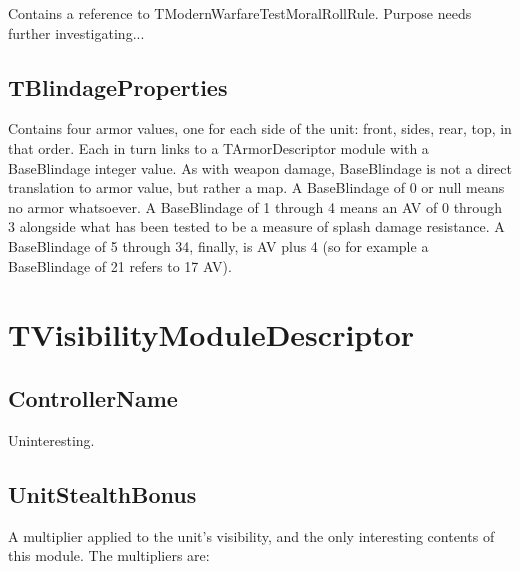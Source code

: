 \documentclass{article}
\begin{document}
Contains a reference to TModernWarfareTestMoralRollRule. Purpose needs further investigating...

\subsection{TBlindageProperties}

Contains four armor values, one for each side of the unit: front, sides, rear, top, in that order. Each in turn links to a TArmorDescriptor module with a BaseBlindage integer value. As with weapon damage, BaseBlindage is not a direct translation to armor value, but rather a map. A BaseBlindage of 0 or null means no armor whatsoever. A BaseBlindage of 1 through 4 means an AV of 0 through 3 alongside what has been tested to be a measure of splash damage resistance. A BaseBlindage of 5 through 34, finally, is AV plus 4 (so for example a BaseBlindage of 21 refers to 17 AV).

\section{TVisibilityModuleDescriptor}

\subsection{ControllerName}

Uninteresting.

\subsection{UnitStealthBonus}

A multiplier applied to the unit's visibility, and the only interesting contents of this module. The multipliers are:
\end{document}
